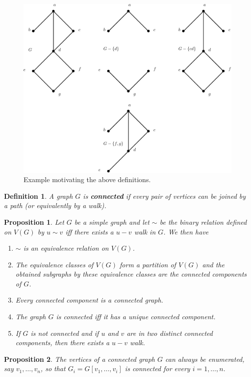\documentclass[12pt,a4paper]{article}
\newtheorem{prop}{Proposition}[section]
\newtheorem{defn}{Definition}[section]
\theoremstyle{definition}
\begin{document}
\begin{figure}[hbtp]
\centering
\includegraphics[scale=.85]{images/graph20.pdf}
\caption{Example motivating the above definitions.}
\end{figure}
\newpage
\begin{defn} A graph $G$ is \textbf{connected} if every pair of vertices can be joined by a path (or equivalently by a walk).
\end{defn}
\begin{prop} Let $G$ be a simple graph and let $\sim$ be the binary relation defined on $V(G)$ by $u \sim v$ iff there exists a $u-v$ walk in $G$. We then have
\begin{enumerate}
\item $\sim$ is an equivalence relation on $V(G)$.
\item  The equivalence classes of $V(G)$ form a partition of $V(G)$ and the obtained subgraphs by these equivalence classes are the connected components of $G$.
\item Every connected component is a connected graph.
\item The graph $G$ is connected iff it has a unique connected component.
\item If $G$ is not connected and if $u$ and $v$ are in two distinct connected components, then there exists a $u-v$ walk. 
\end{enumerate}
\end{prop}
\begin{prop} The vertices of a connected graph $G$ can always be enumerated, say $v_1, \dots , v_n$, so that $G_i = G[v_1, \dots , v_i]$ is connected for every $i=1, \dots , n.$
\end{prop}
\end{document}
